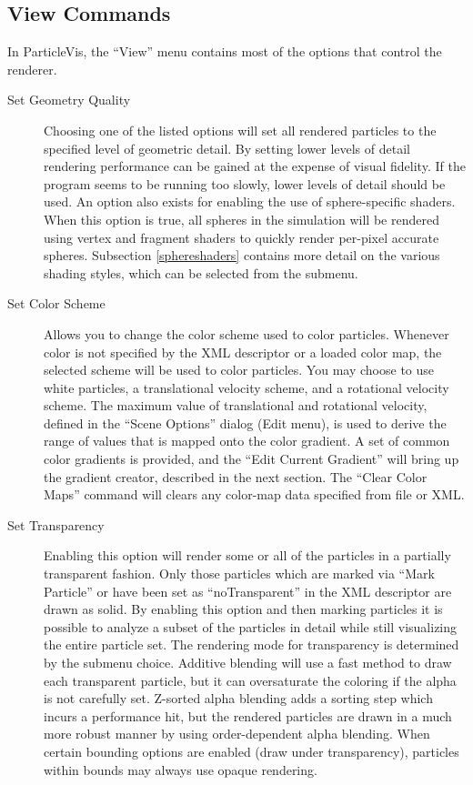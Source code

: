 \subsection{View Commands}
In ParticleVis, the ``View'' menu contains most of the options that control the renderer.   
\begin{description}
\item[Set Geometry Quality]
     Choosing one of the listed options will set all rendered particles to the specified level of geometric detail. By setting lower levels of detail rendering performance can be gained at the expense of visual fidelity. If the program seems to be running too slowly, lower levels of detail should be used.  An option also exists for enabling the use of sphere-specific shaders.  When this option is true, all spheres in the simulation will be rendered using vertex and fragment shaders to quickly render per-pixel accurate spheres.  Subsection \ref{sphereshaders} contains more detail on the various shading styles, which can be selected from the submenu.
\item[Set Color Scheme]
     Allows you to change the color scheme used to color particles.  Whenever color is not specified by the XML descriptor or a loaded color map, the selected scheme will be used to color particles.  You may choose to use white particles, a translational velocity scheme, and a rotational velocity scheme.  The maximum value of translational and rotational velocity, defined in the ``Scene Options'' dialog (Edit menu),  is used to derive the range of values that is mapped onto the color gradient.  A set of common color gradients is provided, and the ``Edit Current Gradient'' will bring up the gradient creator, described in the next section.  The ``Clear Color Maps'' command will clears any color-map data specified from file or XML.
\item[Set Transparency]
     Enabling this option will render some or all of the particles in a partially transparent fashion. Only those particles which are marked via ``Mark Particle'' or have been set as ``noTransparent'' in the XML descriptor are drawn as solid.  By enabling this option and then marking particles it is possible to analyze a subset of the particles in detail while still visualizing the entire particle set.  The rendering mode for transparency is determined by the submenu choice. Additive blending will use a fast method to draw each transparent particle, but it can oversaturate the coloring if the alpha is not carefully set.  Z-sorted alpha blending adds a sorting step which incurs a performance hit, but the rendered particles are drawn in a much more robust manner by using order-dependent alpha blending.  When certain bounding options are enabled (draw under transparency), particles within bounds may always use opaque rendering.

\end{description}
